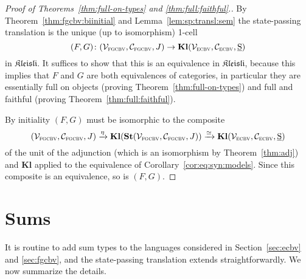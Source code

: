 \documentclass{LMCS}
\newenvironment{proofof}[1]{\begin{proof}[Proof of {#1}.]}{\end{proof}}
\newcommand{\co}{\colon}
\newcommand{\states}{{\underline{\mathrm{S}}}}
\newcommand{\SynEnrichedModel}{(\VSynE,\CSynE, \states)}
\newcommand{\SynKlModel}{(\VSynKl,\CSynKl, J)}
\newcommand{\VSynKl}{\mathcal{V}_{\textsc{fgcbv}}}
\newcommand{\CSynKl}{\mathcal{C}_{\textsc{fgcbv}}}
\newcommand{\VSynE}{\mathcal{V}_{\textsc{ecbv}}}
\newcommand{\CSynE}{\mathcal{C}_{\textsc{ecbv}}}
\newcommand{\Freyd}{\TwoCatFont{Kleisli}}
\newcommand{\FreydToECBV}{\mathbf{St}}
\newcommand{\ECBVToFreyd}{\mathbf{Kl}}
\newcommand{\TwoCatFont}[1]{\mathfrak{#1}}
\begin{document}
\begin{proofof}{Theorems~\ref{thm:full-on-types} and \ref{thm:full:faithful}}
By Theorem~\ref{thm:fgcbv:biinitial} and Lemma~\ref{lem:sp:transl:sem} the state-passing translation is the unique (up to isomorphism) 1-cell
\[(F,G) \co \SynKlModel \to \ECBVToFreyd{\SynEnrichedModel}\]
in $\Freyd$. It suffices to show that this is an equivalence in $\Freyd$, because this implies that $F$ and $G$ are both equivalences of categories, in particular they are essentially full on objects (proving Theorem~\ref{thm:full-on-types}) and full and faithful (proving Theorem~\ref{thm:full:faithful}). 

By initiality $(F,G)$ must be isomorphic to the composite
\[\SynKlModel \xrightarrow{\eta} \ECBVToFreyd(\FreydToECBV\SynKlModel) \xrightarrow{\simeq} \ECBVToFreyd\SynEnrichedModel\]
of the unit of the adjunction (which is an isomorphism by Theorem~\ref{thm:adj}) and $\ECBVToFreyd$ applied to the equivalence of Corollary~\ref{cor:eq:syn:models}. Since this composite is an equivalence, so is $(F,G)$. 
\end{proofof}







\section{Sums}\label{sec:sums}
It is routine to add sum types to the languages considered in 
Section~\ref{sec:ecbv} and \ref{sec:fgcbv},
and the state-passing translation extends straightforwardly.
We now summarize the details.
\end{document}
